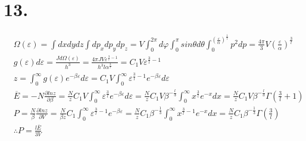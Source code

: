 \documentclass[UTF8]{ctexart}
\begin{document}
\section*{13.}
\begin{equation*}
  \begin{aligned}
     & \Omega(\varepsilon)=\int dxdydz\int dp_xdp_ydp_z=V\int_0^{2\pi}d\varphi\int_0
    ^\pi sin\theta d\theta\int_0^{(\frac{\varepsilon}{\alpha})^{\frac{1}{l}}}p^2dp
    =\frac{4\pi}{3}V(\frac{\varepsilon}{\alpha})^\frac{3}{l}                              \\
     & g(\varepsilon)d\varepsilon=\frac{Jd\Omega(\varepsilon)}{h^3}=\frac{4\pi JV
      \varepsilon^{\frac{3}{l}-1}}{h^3l\alpha^{\frac{3}{l}}}=C_1V\varepsilon^{\frac{3}{l}
    -1}                                                                                   \\
     & z=\int_0^\infty g(\varepsilon)e^{-\beta\varepsilon}d\varepsilon=C_1V\int_0^\infty
    \varepsilon^{\frac{3}{l}-1}e^{-\beta\varepsilon}d\varepsilon                          \\
     & \overline{E}=-N\frac{\partial lnz}{\partial\beta}=\frac{N}{z}C_1V\int_0^\infty
    \varepsilon^{\frac{3}{l}}e^{-\beta\varepsilon}d\varepsilon=\frac{N}{z}C_1V\beta^
    {-\frac{l}{3}}\int_0^\infty x^{\frac{3}{l}}e^{-x}dx=\frac{N}{z}C_1V\beta^
    {-\frac{l}{3}}\Gamma(\frac{3}{l}+1)                                                   \\
     & P=\frac{N}{\beta}\frac{\partial lnz}{\partial V}=\frac{N}{\beta z}C_1\int_0^\infty
    \varepsilon^{\frac{3}{l}-1}e^{-\beta\varepsilon}=\frac{N}{z}C_1\beta^{-\frac{1}{3}}
    \int_0^\infty x^{\frac{3}{l}-1}e^{-x}dx=\frac{N}{z}C_1\beta^{-\frac{1}{3}}\Gamma
    (\frac{3}{l})                                                                         \\
     & \therefore P=\frac{l\overline{E}}{3V}                                              \\
  \end{aligned}
\end{equation*}
\end{document}
